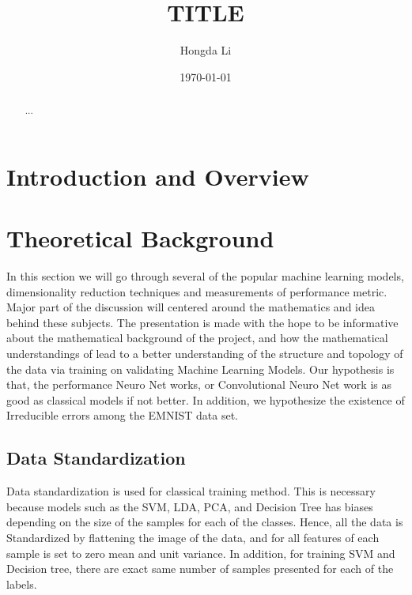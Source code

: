 \documentclass{article}
\title{TITLE}
\author{Hongda Li}
\date{\today}
\begin{document}
\maketitle

\begin{abstract}
   ...
\end{abstract}


\section{Introduction and Overview}


\section{Theoretical Background}
    \hspace{1.1em}
    In this section we will go through several of the popular machine learning models, dimensionality reduction techniques and measurements of performance metric. Major part of the discussion will centered around the mathematics and idea behind these subjects. The presentation is made with the hope to be informative about the mathematical background of the project, and how the mathematical understandings of lead to a better understanding of the structure and topology of the data via training on validating Machine Learning Models. Our hypothesis is that, the performance Neuro Net works, or Convolutional Neuro Net work is as good as classical models if not better. In addition, we hypothesize the existence of Irreducible errors among the EMNIST data set. 
    \subsection{Data Standardization}
        \hspace{1.1em}
        Data standardization is used for classical training method. This is necessary because models such as the SVM, LDA, PCA, and Decision Tree has biases depending on the size of the samples for each of the classes. Hence, all the data is Standardized by flattening the image of the data, and for all features of each sample is set to zero mean and unit variance. In addition, for training SVM and Decision tree, there are exact same number of samples presented for each of the labels. 
\end{document}
